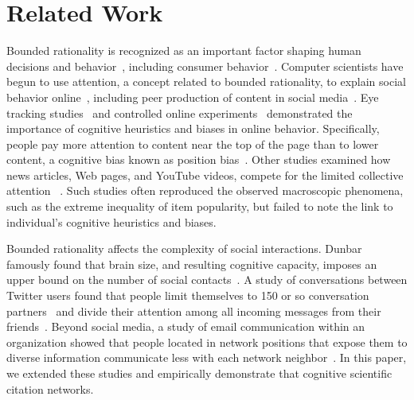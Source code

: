 \documentclass[10pt]{bmc_article}
\newenvironment{bmcformat}{\baselineskip20pt\sloppy\setboolean{publ}{false}}{\baselineskip20pt\sloppy}
\begin{document}
\begin{bmcformat}
\section{Related Work}
Bounded rationality is recognized as an important factor shaping human decisions and behavior~\cite{Kahneman73}, including consumer behavior~\cite{Anderson09,blus:2008tn,Falkinger2007Attention}.
Computer scientists have begun to use attention, a concept related to bounded rationality, to explain social behavior online~\cite{Goldhaber97}, including peer production of content in social media~\cite{Wilkinson08,Hodas14srep}.
Eye tracking studies~\cite{Buscher09,Counts11} and controlled online experiments~\cite{Lerman14plosone} demonstrated the importance of cognitive heuristics and biases in online behavior. Specifically, people pay more attention to content near the top of the page than to lower content, a cognitive bias known as position bias~\cite{Payne51}.
Other studies examined how news articles, Web pages, and YouTube videos, compete for the limited collective attention%
~\cite{Moussaid09,Ratkiewicz10,Weng12,Cattuto12}.%
Such studies often reproduced the observed macroscopic phenomena, such as the extreme inequality of item popularity, but failed to note the link to individual's cognitive heuristics and biases.

Bounded rationality affects the complexity of social interactions. Dunbar famously found that brain size, and resulting cognitive capacity, imposes an upper bound on the number of social contacts~\cite{Dunbar}.
A study of conversations between Twitter users found that people limit themselves to 150 or so conversation partners~\cite{Goncalves11} and divide their attention among all incoming messages from their friends~\cite{Hodas12socialcom}. Beyond social media, a study of  email communication within an organization  showed that people  located in network positions that expose them to diverse information communicate less with each network neighbor~\cite{Aral07}.%
In this paper, we extended these studies and empirically demonstrate that %
cognitive
scientific citation networks.


\end{bmcformat}
\end{document}
